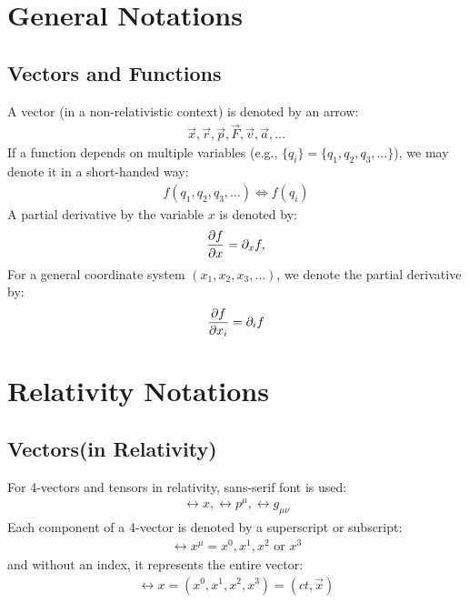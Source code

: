 \section{General Notations}
\label{sec:notations}
\subsection{Vectors and Functions}
A vector (in a non-relativistic context) is denoted by an arrow:
\begin{align}
  \vec{x}, \vec{r}, \vec{p}, \vec{F}, \vec{v}, \vec{a}, \ldots
\end{align}
If a function depends on multiple variables (e.g., $\{q_i\} = \{q_1, q_2, q_3, \ldots\}$), we may denote it in a short-handed way:
\begin{align}
  f(q_1, q_2, q_3, \ldots) \iff f(q_i)
\end{align}
A partial derivative by the variable $x$ is denoted by:
\begin{align}
  \pdv{f}{x} = \pdif{x} f,
\end{align}
For a general coordinate system $(x_1, x_2, x_3, \ldots)$, we denote the partial derivative by:
\begin{align}
  \pdv{f}{x_i} = \pdif{i} f
\end{align}

\section{Relativity Notations}
\subsection{Vectors(in Relativity)}
For 4-vectors and tensors in relativity, sans-serif font is used:
\begin{align}
  \rel{x}, \rel{p}^\mu, \rel{g}_{\mu \nu}
\end{align}
Each component of a 4-vector is denoted by a superscript or subscript:
\begin{align}
  \rel{x}^\mu = x^0, x^1, x^2 \text{ or } x^3
\end{align}
and without an index, it represents the entire vector:
\begin{align}
  \rel{x} = (x^0, x^1, x^2, x^3) = (ct, \vec{x})
\end{align}


